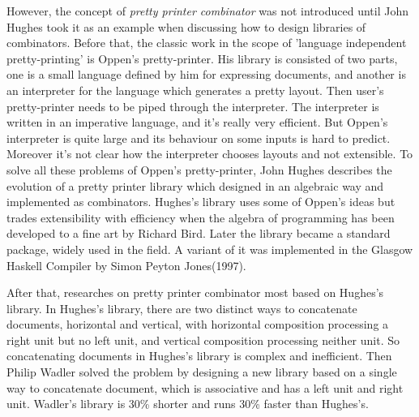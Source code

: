 However, the concept of \textit{pretty printer combinator} was not introduced until John Hughes took it as an example when discussing how to design libraries of combinators\cite{hughes1995design}. Before that, the classic work in the scope of 'language independent pretty-printing' is Oppen's pretty-printer\cite{oppen1980prettyprinting}. His library is consisted of two parts, one is a small language defined by him for expressing documents, and another is an interpreter for the language which generates a pretty layout. Then user's pretty-printer needs to be piped through the interpreter. The interpreter is written in an imperative language, and it's really very efficient. But Oppen's interpreter is quite large and its behaviour on some inputs is hard to predict. Moreover it's not clear how the interpreter chooses layouts and not extensible. To solve all these problems of Oppen's pretty-printer, John Hughes describes the evolution of a pretty printer library which designed in an algebraic way and implemented as combinators. Hughes's library uses some of Oppen's ideas but trades extensibility with efficiency when the algebra of programming has been developed to a fine art by Richard Bird\cite{bird1996algebra}. Later the library became a standard package, widely used in the field. A variant of it was implemented in the Glasgow Haskell Compiler by Simon Peyton Jones(1997)\cite{wadler2003prettier}.

After that, researches on pretty printer combinator most based on Hughes's library. In Hughes's library, there are two distinct ways to concatenate documents, horizontal and vertical, with horizontal composition processing a right unit but no left unit, and vertical composition processing neither unit\cite{wadler2003prettier}. So concatenating documents in Hughes's library is complex and inefficient. Then Philip Wadler solved the problem by designing a new library based on a single way to concatenate document, which is associative and has a left unit and right unit\cite{wadler2003prettier}. Wadler's library is 30\% shorter and runs 30\% faster than Hughes's.






